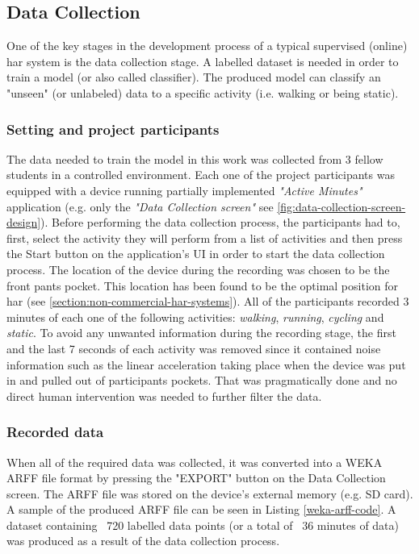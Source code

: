     \subsection{Data Collection}
    One of the key stages in the development process of a typical supervised (online) \gls{har} system is the data collection stage. A labelled dataset is needed in order to train a model (or also called classifier). The produced model can classify an "unseen" (or unlabeled) data to a specific activity (i.e. walking or being static).
    
    \subsubsection*{Setting and project participants}
    The data needed to train the model in this work was collected from 3 fellow students in a controlled environment. Each one of the project participants was equipped with a device running partially implemented \textit{"Active Minutes"} application (e.g. only the \textit{"Data Collection screen"} see \ref{fig:data-collection-screen-design}). Before performing the data collection process, the participants had to, first, select the activity they will perform from a list of activities and then press the Start button on the application's UI in order to start the data collection process. The location of the device during the recording was chosen to be the front pants pocket. This location has been found to be the optimal position for \gls{har} (see \ref{section:non-commercial-har-systems}). All of the participants recorded 3 minutes of each one of the following activities: \textit{walking}, \textit{running}, \textit{cycling} and \textit{static}. To avoid any unwanted information during the recording stage, the first and the last 7 seconds of each activity was removed since it contained noise information such as the linear acceleration taking place when the device was put in and pulled out of participants pockets. That was pragmatically done and no direct human intervention was needed to further filter the data.
    
    \subsubsection*{Recorded data}
    \label{subsubsection:recorded_data}
    When all of the required data was collected, it was converted into a WEKA ARFF file format by pressing the "EXPORT" button on the Data Collection screen. The ARFF file was stored on the device's external memory (e.g. SD card). A sample of the produced ARFF file can be seen in Listing \ref{weka-arff-code}. A dataset containing ~720 labelled data points (or a total of ~36 minutes of data) was produced as a result of the data collection process. 
    

